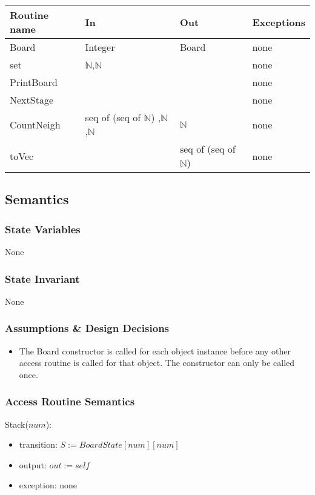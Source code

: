 \documentclass[12pt]{article}
\begin{document}
\begin{tabular}{| l | l | l | p{5cm} |}
\hline
\textbf{Routine name} & \textbf{In} & \textbf{Out} & \textbf{Exceptions}\\
\hline
Board & Integer & Board & none\\
\hline
set & $\mathbb{N}$,$\mathbb{N}$ &  & none\\
\hline
PrintBoard & &  & none\\
\hline
NextStage & &  & none\\
\hline
CountNeigh & seq of (seq of $\mathbb{N}$) ,$\mathbb{N}$ ,$\mathbb{N}$ & $\mathbb{N}$ & none\\
\hline
toVec& & seq of (seq of $\mathbb{N}$) & none\\
\hline
\end{tabular}

\subsection* {Semantics}

\subsubsection* {State Variables}

None

\subsubsection* {State Invariant}

None

\subsubsection* {Assumptions \& Design Decisions}

\begin{itemize}
\item The Board constructor is called for each object instance before any
  other access routine is called for that object.  The constructor can only be
  called once.
\end{itemize}

\subsubsection* {Access Routine Semantics}

Stack($num$):
\begin{itemize}
\item transition: $S := BoardState[num][num]$

\item output: $\mathit{out} := \mathit{self}$
\item exception: none
\end{itemize}
\end{document}
